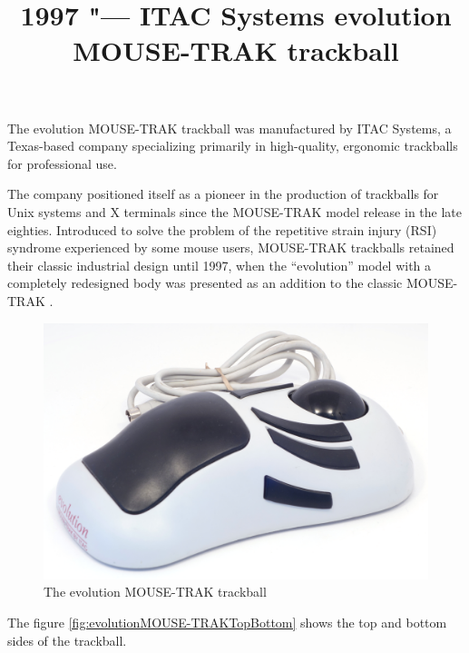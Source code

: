 \documentclass[11pt, a4paper]{article}
\begin{document}
\title{1997 "--- ITAC Systems evolution MOUSE-TRAK trackball}
\date{}
\maketitle
{}
The evolution MOUSE-TRAK trackball was manufactured by ITAC Systems, a Texas-based company specializing primarily in high-quality, ergonomic trackballs for professional use.

The company positioned itself as a pioneer in the production of trackballs for Unix systems and X terminals since the MOUSE-TRAK model release in the late eighties. Introduced to solve the problem of the repetitive strain injury (RSI) syndrome experienced by some mouse users, MOUSE-TRAK trackballs retained their classic industrial design until 1997, when the ``evolution'' model with a completely redesigned body was presented as an addition to the classic MOUSE-TRAK \cite{announcement, description}.

\begin{figure}[h]
    \centering
    \includegraphics[scale=0.3]{1997_mousetrak_evolution/pic_30.jpg}
    \caption{The evolution MOUSE-TRAK trackball}
    \label{fig:evolutionMOUSE-TRAK}
\end{figure}

The figure \ref{fig:evolutionMOUSE-TRAKTopBottom} shows the top and bottom sides of the trackball.
\end{document}
